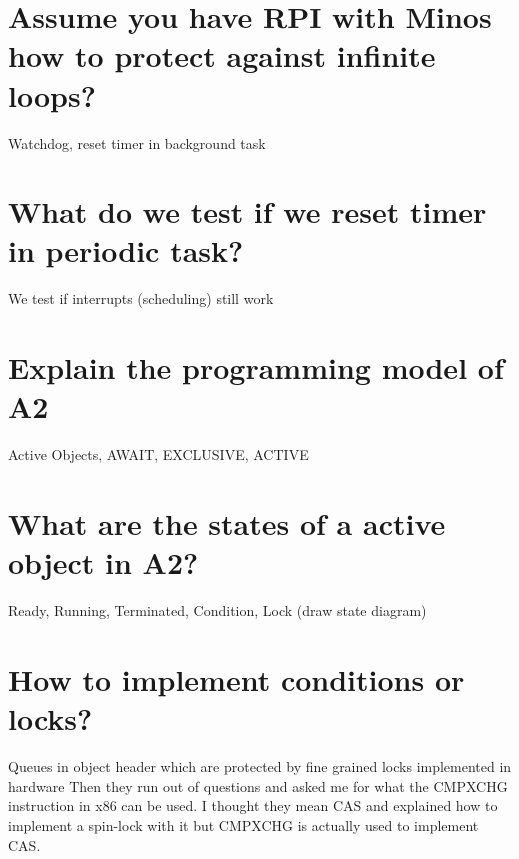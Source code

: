 \documentclass[a4paper,12pt]{article}
\begin{document}
\section{Assume you have RPI with Minos how to protect against infinite loops?}

Watchdog, reset timer in background task

\section{What do we test if we reset timer in periodic task?}

We test if interrupts (scheduling) still work

\section{Explain the programming model of A2}

Active Objects, AWAIT, EXCLUSIVE, ACTIVE

\section{What are the states of a active object in A2?}

Ready, Running, Terminated, Condition, Lock (draw state diagram)

\section{How to implement conditions or locks?}

Queues in object header which are protected by fine grained locks implemented in hardware 
\bigbreak
Then they run out of questions and asked me for what the CMPXCHG instruction in x86 can be used. I thought they mean CAS and explained how to implement a spin-lock with it but CMPXCHG is actually used to implement CAS.
\end{document}
